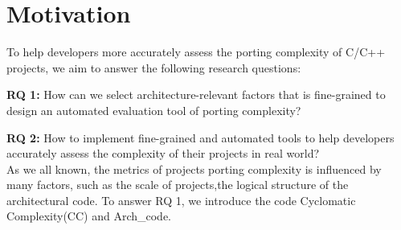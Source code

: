 \documentclass[sigconf,screen,review,anonymous]{acmart}
\begin{document}
\section{Motivation}
To help developers more accurately assess the porting complexity of C/C++ projects, we aim to answer the following research questions:

\textbf{RQ 1:} How can we select architecture-relevant factors that is fine-grained to design an automated evaluation tool of porting complexity?

\textbf{RQ 2:} How to implement fine-grained and automated tools to help developers accurately assess the complexity of their projects in real world?\\
As we all known, the metrics of projects porting complexity is influenced by many factors, such as the scale of projects,the logical structure of the architectural code. To answer RQ 1, we introduce the code Cyclomatic Complexity(CC) and Arch\_code.
 
\end{document}
